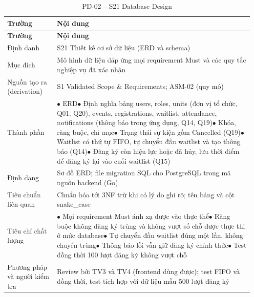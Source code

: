 \begingroup\tblsetup\tblzebra
\begin{longtable}{L{3.4cm}L{11.6cm}}
\caption{PD-02 -- S21 Database Design}\label{tab:pd-02}\\
\toprule
{}\textbf{Trường} & \textbf{Nội dung} \\
\midrule
\endfirsthead
\toprule
{}\textbf{Trường} & \textbf{Nội dung} \\
\midrule
\endhead
\bottomrule
\endlastfoot
Định danh & S21 Thiết kế cơ sở dữ liệu (ERD và schema) \\
Mục đích & Mô hình dữ liệu đáp ứng mọi requirement Must và các quy tắc nghiệp vụ đã xác nhận \\
Nguồn tạo ra (derivation) & S1 Validated Scope \& Requirements; ASM-02 (quy mô) \\
Thành phần & $\bullet$ ERD\newline $\bullet$ Định nghĩa bảng users, roles, units (đơn vị tổ chức, Q01, Q20), events, registrations, waitlist, attendance, notifications (thông báo trong ứng dụng, Q14, Q19)\newline $\bullet$ Khóa, ràng buộc, chỉ mục\newline $\bullet$ Trạng thái sự kiện gồm Cancelled (Q19)\newline $\bullet$ Waitlist có thứ tự FIFO, tự chuyển đầu waitlist và tạo thông báo (Q14)\newline $\bullet$ Đăng ký còn hiệu lực hoặc đã hủy, lưu thời điểm để đăng ký lại vào cuối waitlist (Q15) \\
Định dạng & Sơ đồ ERD; file migration SQL cho PostgreSQL trong mã nguồn backend (Go) \\
Tiêu chuẩn liên quan & Chuẩn hóa tới 3NF trừ khi có lý do ghi rõ; tên bảng và cột snake\_case \\
Tiêu chí chất lượng & $\bullet$ Mọi requirement Must ánh xạ được vào thực thể\newline $\bullet$ Ràng buộc không đăng ký trùng và không vượt số chỗ được thực thi ở mức database\newline $\bullet$ Tự chuyển đầu waitlist đúng một lần, không chuyển trùng\newline $\bullet$ Thông báo lỗi vẫn giữ đăng ký chính thức\newline $\bullet$ Test đồng thời 100 lượt đăng ký không vượt chỗ \\
Phương pháp và người kiểm tra & Review bởi TV3 và TV4 (frontend dùng được); test FIFO và đồng thời, test tích hợp với dữ liệu mẫu 500 lượt đăng ký \\
\end{longtable}
\endgroup

